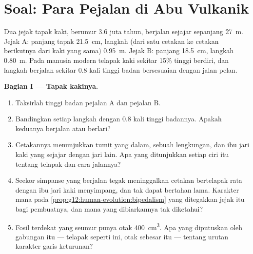 \section{Soal: Para Pejalan di Abu Vulkanik}

\begin{problem}
\label{pb:g12:human-evolution:1}
Dua jejak tapak kaki, berumur 3.6 juta tahun, berjalan sejajar
sepanjang \qty{27}{m}. Jejak A: panjang tapak \qty{21.5}{cm}, langkah
(dari satu cetakan ke cetakan berikutnya dari kaki yang sama)
\qty{0.95}{m}. Jejak B: panjang \qty{18.5}{cm}, langkah
\qty{0.80}{m}. Pada manusia modern telapak kaki sekitar 15\% tinggi
berdiri, dan langkah berjalan sekitar 0.8 kali tinggi badan
bersesuaian dengan jalan pelan.

\medskip
\noindent\textbf{Bagian I --- Tapak kakinya.}
\begin{enumerate}
  \item Taksirlah tinggi badan pejalan A dan pejalan B.
  \item Bandingkan setiap langkah dengan 0.8 kali tinggi badannya.
        Apakah keduanya berjalan atau berlari?
  \item Cetakannya menunjukkan tumit yang dalam, sebuah lengkungan,
        dan ibu jari kaki yang sejajar dengan jari lain. Apa yang
        ditunjukkan setiap ciri itu tentang telapak dan cara jalannya?
  \item Seekor simpanse yang berjalan tegak meninggalkan cetakan
        bertelapak rata dengan ibu jari kaki menyimpang, dan tak dapat
        bertahan lama. Karakter mana pada
        \cref{prop:g12:human-evolution:bipedalism} yang ditegakkan
        jejak itu bagi pembuatnya, dan mana yang dibiarkannya tak
        diketahui?
  \item Fosil terdekat yang seumur punya otak \qty{400}{cm^3}. Apa
        yang diputuskan oleh gabungan itu --- telapak seperti ini,
        otak sebesar itu --- tentang urutan karakter garis keturunan?
\end{enumerate}


\end{problem}

